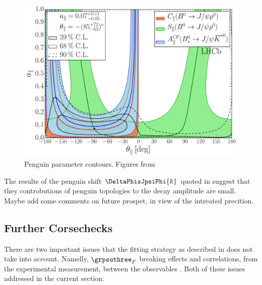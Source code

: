 \begin{figure}[h]
\begin{center}
  \includegraphics[trim=0.0cm 0.0cm 0.0cm 0.0cm, clip=true,scale=0.33]{Figures/Chapter5/Penguin_Contribution_Ang_vs_Abs_allB2VV_Para.pdf}
  \caption{Penguin parameter contours. Figures from~\cite{DeBruyn-thesis}}
  \label{pengPlot_para}
\end{center}
\end{figure}


The results of the penguin shift $\DeltaPhisJpsiPhi{k}$ quoted in 
suggest that they controbutions of penguin topologies to the \BsJpsiPhi decay amplitude are small.
{\color{red} Maybe add some comments on future prospet, in view of the intreated precition.}

\subsection{Further Corsechecks}
There are two important issues that the fitting strategy as described in 
does not take into account. Namelly, $\grpsuthree_F$ breaking effects and correlations, from the
experimental measurement, between the observables . Both of these issues
addressed in the current section.

